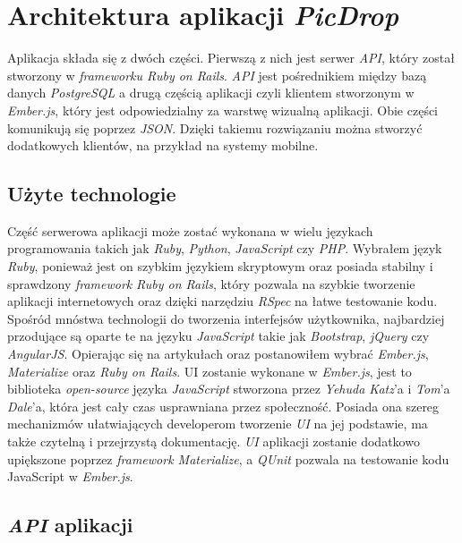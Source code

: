\documentclass[openright]{xmgr}
\begin{document}
\chapter{Architektura aplikacji \textit{PicDrop}}
Aplikacja składa się z dwóch części. Pierwszą z nich jest serwer \textit{API}, który został stworzony w \textit{frameworku Ruby on Rails}. \textit{API} jest pośrednikiem między bazą danych \textit{PostgreSQL} a drugą częścią aplikacji czyli klientem stworzonym w \textit{Ember.js}, który jest odpowiedzialny za warstwę wizualną aplikacji. Obie części komunikują się poprzez \textit{JSON}. Dzięki takiemu rozwiązaniu można stworzyć dodatkowych klientów, na przykład na systemy mobilne.

\section{Użyte technologie}
Część serwerowa aplikacji może zostać wykonana w wielu językach programowania takich jak \textit{Ruby}, \textit{Python}, \textit{JavaScript} czy \textit{PHP}.
Wybrałem język \textit{Ruby}, ponieważ jest on szybkim językiem skryptowym oraz posiada stabilny i sprawdzony \textit{framework} \textit{Ruby on Rails}, który pozwala na szybkie tworzenie aplikacji internetowych oraz dzięki narzędziu \textit{RSpec} na łatwe testowanie kodu.
Spośród mnóstwa technologii do tworzenia interfejsów użytkownika, najbardziej przodujące są oparte te na języku \textit{JavaScript} takie jak \textit{Bootstrap},\textit{ jQuery} czy \textit{AngularJS}. Opierając się na artykułach \cite{emberRails} oraz \cite{Ember} postanowiłem wybrać \textit{Ember.js}, \textit{Materialize} oraz \textit{Ruby on Rails}. UI zostanie wykonane w \textit{Ember.js}, jest to  biblioteka  \textit{open-source} języka \textit{JavaScript} stworzona  przez  \textit{Yehuda Katz}'a i \textit{Tom}'a \textit{Dale}'a, która jest cały czas usprawniana przez społeczność. Posiada ona szereg mechanizmów ułatwiających developerom tworzenie \textit{UI} na jej podstawie, ma także czytelną i przejrzystą dokumentację. \textit{UI} aplikacji zostanie dodatkowo upiększone poprzez \textit{framework Materialize}, a \textit{QUnit} pozwala na testowanie kodu JavaScript w \textit{Ember.js}.

\section{\textit{API} aplikacji}
\end{document}
